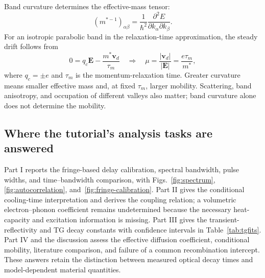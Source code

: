 Band curvature determines the effective-mass tensor:
\begin{equation}
(m^{*-1})_{\alpha\beta}
=\frac{1}{\hbar^2}\frac{\partial^2E}{\partial k_\alpha\partial k_\beta}.
\end{equation}
For an isotropic parabolic band in the relaxation-time approximation, the steady drift follows from
\begin{equation}
0=q_c\mathbf E-\frac{m^*\mathbf v_d}{\tau_m}
\quad\Rightarrow\quad
\mu=\frac{|\mathbf v_d|}{|\mathbf E|}
=\frac{e\tau_m}{m^*},
\end{equation}
where $q_c=\pm e$ and $\tau_m$ is the momentum-relaxation time. Greater curvature means smaller effective mass and, at fixed $\tau_m$, larger mobility. Scattering, band anisotropy, and occupation of different valleys also matter; band curvature alone does not determine the mobility.

\subsection{Where the tutorial's analysis tasks are answered}
Part I reports the fringe-based delay calibration, spectral bandwidth, pulse widths, and time--bandwidth comparison, with Figs.~\ref{fig:spectrum}, \ref{fig:autocorrelation}, and~\ref{fig:fringe-calibration}. Part II gives the conditional cooling-time interpretation and derives the coupling relation; a volumetric electron--phonon coefficient remains undetermined because the necessary heat-capacity and excitation information is missing. Part III gives the transient-reflectivity and TG decay constants with confidence intervals in Table~\ref{tab:tgfits}. Part IV and the discussion assess the effective diffusion coefficient, conditional mobility, literature comparison, and failure of a common recombination intercept. These answers retain the distinction between measured optical decay times and model-dependent material quantities.

